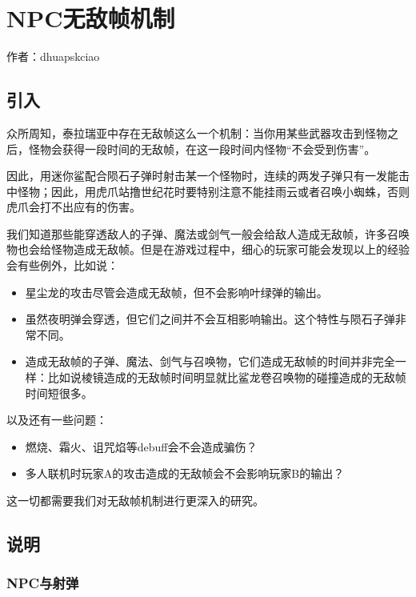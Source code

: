 \chapter{NPC无敌帧机制}
\begin{center}
作者：dhuapskciao
\end{center}

\section{引入}

众所周知，泰拉瑞亚中存在无敌帧这么一个机制：当你用某些武器攻击到怪物之后，怪物会获得一段时间的无敌帧，在这一段时间内怪物“不会受到伤害”。

因此，用迷你鲨配合陨石子弹时射击某一个怪物时，连续的两发子弹只有一发能击中怪物；因此，用虎爪站撸世纪花时要特别注意不能挂雨云或者召唤小蜘蛛，否则虎爪会打不出应有的伤害。

我们知道那些能穿透敌人的子弹、魔法或剑气一般会给敌人造成无敌帧，许多召唤物也会给怪物造成无敌帧。但是在游戏过程中，细心的玩家可能会发现以上的经验会有些例外，比如说：

\begin{itemize}
\item 星尘龙的攻击尽管会造成无敌帧，但不会影响叶绿弹的输出。
\item 虽然夜明弹会穿透，但它们之间并不会互相影响输出。这个特性与陨石子弹非常不同。
\item 造成无敌帧的子弹、魔法、剑气与召唤物，它们造成无敌帧的时间并非完全一样：比如说棱镜造成的无敌帧时间明显就比鲨龙卷召唤物的碰撞造成的无敌帧时间短很多。
\end{itemize}

以及还有一些问题：

\begin{itemize}
\item 燃烧、霜火、诅咒焰等debuff会不会造成骗伤？
\item 多人联机时玩家A的攻击造成的无敌帧会不会影响玩家B的输出？
\end{itemize}

这一切都需要我们对无敌帧机制进行更深入的研究。

\section{说明}

\subsection{NPC与射弹}


